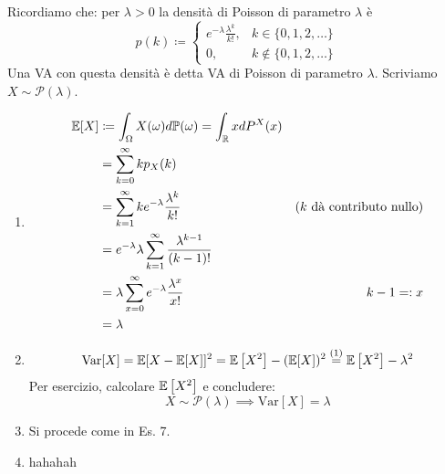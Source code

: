 \Soluzione

Ricordiamo che: per $\lambda  >0$ la densità di Poisson di parametro $\lambda $ è
\begin{equation*}
p(k) \coloneqq
\begin{cases}
e^{-\lambda }\frac{\lambda^{k}}{k!} , & k\in \{0,1,2,\dots \}\\
0, & k\notin \{0,1,2,\dots \}
\end{cases}
\end{equation*}
Una VA con questa densità è detta VA di Poisson di parametro $\lambda $. Scriviamo $X\sim \mathcal{P}(\lambda)$.
\begin{enumerate}
\item
\begin{align*}
\mathbb{E}[X] & \coloneqq \int_{\Omega } X(\omega) d\mathbb{P}(\omega) =\int_{\mathbb{R}} xdP^{X}(x) & \\
 & =\sum\limits_{k=0}^{\infty } kp_{X}(k) & \\
 & =\sum\limits_{k=1}^{\infty } ke^{-\lambda }\frac{\lambda^{k}}{k!} & \text{(} k\ \text{dà contributo nullo)}\\
 & =e^{-\lambda } \lambda \sum\limits_{k=1}^{\infty }\frac{\lambda^{k-1}}{(k-1) !} & \\
 & =\lambda \sum\limits_{x=0}^{\infty } e^{-\lambda }\frac{\lambda^{x}}{x!} & k-1=:x\\
 & =\lambda  & 
\end{align*}
\item
\begin{equation*}
\mathrm{Var}[X] =\mathbb{E}[X-\mathbb{E}[X]]^{2} =\mathbb{E}\left[X^{2}\right] -(\mathbb{E}[X])^{2}\overset{(1)}{=}\mathbb{E}\left[X^{2}\right] -\lambda^{2}
\end{equation*}
Per esercizio, calcolare $\mathbb{E}\left[X^{2}\right]$ e concludere:
\begin{equation*}
X\sim \mathcal{P}(\lambda) \implies \mathrm{Var}[X] =\lambda 
\end{equation*}
\item Si procede come in Es. 7.
\item hahahah
\end{enumerate}

\Soluzione

